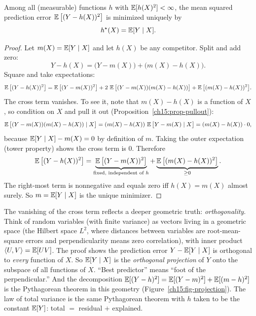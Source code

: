 \begin{theorem}
\label{ch15:thm-best-predictor}
Among all (measurable) functions $h$ with $\operatorname{\mathbb{E}}[h(X)^2] < \infty$, the mean squared prediction error
$\operatorname{\mathbb{E}}\big[(Y - h(X))^2\big]$ is minimized uniquely by
\[
  h^\star(X) = \operatorname{\mathbb{E}}[Y \mid X].
\]
\end{theorem}

\begin{proof}
Let $m(X) = \operatorname{\mathbb{E}}[Y\mid X]$ and let $h(X)$ be any competitor. Split and add zero:
\[
  Y - h(X) = \big(Y - m(X)\big) + \big(m(X) - h(X)\big).
\]
Square and take expectations:
\[
  \operatorname{\mathbb{E}}\big[(Y-h(X))^2\big]
  = \operatorname{\mathbb{E}}\big[(Y - m(X))^2\big] + 2\,\operatorname{\mathbb{E}}\big[(Y-m(X))(m(X)-h(X))\big] + \operatorname{\mathbb{E}}\big[(m(X)-h(X))^2\big].
\]
The cross term vanishes. To see it, note that $m(X) - h(X)$ is a function of $X$, so condition on $X$
and pull it out (Proposition~\ref{ch15:prop-pullout}):
\[
  \operatorname{\mathbb{E}}\big[(Y-m(X))(m(X)-h(X)) \mid X\big]
  = (m(X)-h(X))\,\operatorname{\mathbb{E}}\big[Y - m(X)\mid X\big]
  = (m(X)-h(X))\cdot 0,
\]
because $\operatorname{\mathbb{E}}[Y\mid X] - m(X) = 0$ by definition of $m$. Taking the outer expectation (tower property)
shows the cross term is $0$. Therefore
\[
  \operatorname{\mathbb{E}}\big[(Y - h(X))^2\big] = \underbrace{\operatorname{\mathbb{E}}\big[(Y-m(X))^2\big]}_{\text{fixed, independent of }h}
  + \underbrace{\operatorname{\mathbb{E}}\big[(m(X)-h(X))^2\big]}_{\ge 0}.
\]
The right-most term is nonnegative and equals zero iff $h(X) = m(X)$ almost surely. So $m = \operatorname{\mathbb{E}}[Y\mid X]$
is the unique minimizer.
\end{proof}

\begin{happeningbox}
The vanishing of the cross term reflects a deeper geometric truth: \emph{orthogonality}. Think of
random variables (with finite variance) as vectors living in a geometric space (the Hilbert space $L^2$,
where distances between variables are root-mean-square errors and perpendicularity means zero correlation),
with inner product $\langle U, V\rangle = \operatorname{\mathbb{E}}[UV]$. The proof shows the prediction error $Y - \operatorname{\mathbb{E}}[Y\mid X]$
is orthogonal to \emph{every} function of $X$. So $\operatorname{\mathbb{E}}[Y\mid X]$ is the \emph{orthogonal projection} of $Y$
onto the subspace of all functions of $X$. ``Best predictor'' means ``foot of the perpendicular.''
And the decomposition $\operatorname{\mathbb{E}}[(Y-h)^2] = \operatorname{\mathbb{E}}[(Y-m)^2] + \operatorname{\mathbb{E}}[(m-h)^2]$ is the Pythagorean theorem in this
geometry (Figure~\ref{ch15:fig-projection}). The law of total variance is the same Pythagorean theorem with
$h$ taken to be the constant $\operatorname{\mathbb{E}}[Y]$: total $=$ residual $+$ explained.
\end{happeningbox}

